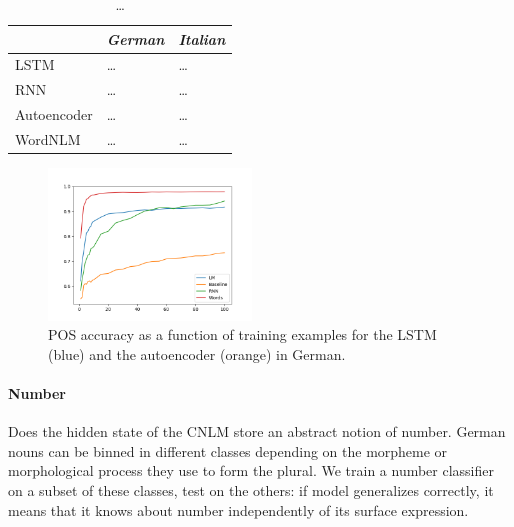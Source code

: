 \begin{table}[t]
  \begin{center}
    \begin{tabular}{l|l|l}
      \multicolumn{1}{c}{}&\emph{German}&\emph{Italian}\\
      \hline
      LSTM&\ldots&\ldots\\
      RNN&\ldots&\ldots\\
      Autoencoder&\ldots&\ldots\\
      WordNLM&\ldots&\ldots\\
    \end{tabular}
  \end{center}
  \caption{\label{tab:pos-results} \ldots}
\end{table}


\begin{figure}
\includegraphics[width=0.48\textwidth]{figures/german_pos_nouns_verbs.png}
	\caption{POS accuracy as a function of training examples for the LSTM (blue) and the autoencoder (orange) in German.}\label{fig:pos-induction}
\end{figure}





\paragraph{Number}

Does the hidden state of the CNLM store an abstract notion of
number. German nouns can be binned in different classes depending on
the morpheme or morphological process they use to form the plural. We
train a number classifier on a subset of these classes, test on the
others: if model generalizes correctly, it means that it knows about
number independently of its surface expression.

